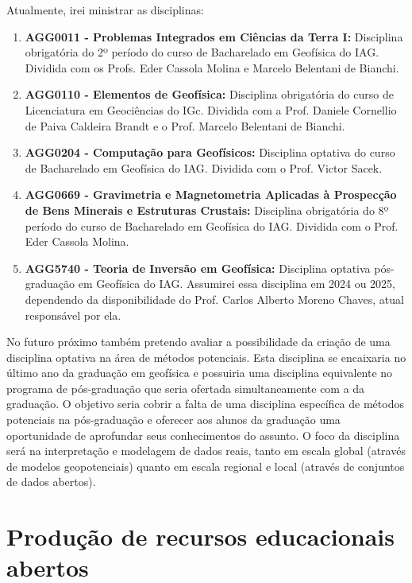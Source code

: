 \documentclass[12pt,a4paper,oneside]{book}
\begin{document}
Atualmente, irei ministrar as disciplinas:

\begin{enumerate}
  \item \textbf{AGG0011 - Problemas Integrados em Ciências da Terra I:}
    Disciplina obrigatória do 2º período do curso de Bacharelado em Geofísica do IAG.
    Dividida com os Profs. Eder Cassola Molina e Marcelo Belentani de
    Bianchi.
  \item \textbf{AGG0110 - Elementos de Geofísica:}
    Disciplina obrigatória do curso de Licenciatura em Geociências do IGc.
    Dividida com a Prof. Daniele Cornellio de Paiva Caldeira Brandt e o Prof.
    Marcelo Belentani de Bianchi.
  \item \textbf{AGG0204 - Computação para Geofísicos:}
    Disciplina optativa do curso de Bacharelado em Geofísica do IAG.
    Dividida com o Prof. Victor Sacek.
  \item \textbf{AGG0669 - Gravimetria e Magnetometria Aplicadas à Prospecção de
    Bens Minerais e Estruturas Crustais:}
    Disciplina obrigatória do 8º período do curso de Bacharelado em Geofísica do IAG.
    Dividida com o Prof. Eder Cassola Molina.
  \item \textbf{AGG5740 - Teoria de Inversão em Geofísica:}
    Disciplina optativa pós-graduação em Geofísica do IAG.
    Assumirei essa disciplina em 2024 ou 2025, dependendo da disponibilidade
    do Prof. Carlos Alberto Moreno Chaves, atual responsável por ela.
\end{enumerate}

No futuro próximo também pretendo avaliar a possibilidade da criação de uma
disciplina optativa na área de métodos potenciais. Esta disciplina se
encaixaria no último ano da graduação em geofísica e possuiria uma disciplina
equivalente no programa de pós-graduação que seria ofertada simultaneamente com
a da graduação. O objetivo seria cobrir a falta de uma disciplina específica de
métodos potenciais na pós-graduação e oferecer aos alunos da graduação uma
oportunidade de aprofundar seus conhecimentos do assunto.
O foco da disciplina será na interpretação e modelagem de dados reais, tanto em
escala global (através de modelos geopotenciais) quanto em escala regional e
local (através de conjuntos de dados abertos).



\section{Produção de recursos educacionais abertos}
\end{document}
